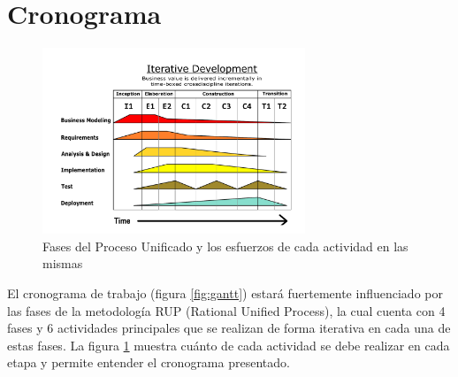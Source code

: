 \section{Cronograma}

\begin{figure}[!h]
    \centering
    \includegraphics[width=0.7\textwidth]{assets/rupphases}
    \caption{Fases del Proceso Unificado y los esfuerzos de cada actividad en las mismas}
    \label{fig:rupphases}
\end{figure}

El cronograma de trabajo (figura \ref{fig:gantt}) estará fuertemente influenciado por las fases de la metodología RUP (Rational Unified Process), la cual cuenta con 4 fases y 6 actividades principales que se realizan de forma iterativa en cada una de estas fases. La figura \ref{fig:rupphases} muestra cuánto de cada actividad se debe realizar en cada etapa y permite entender el cronograma presentado.

